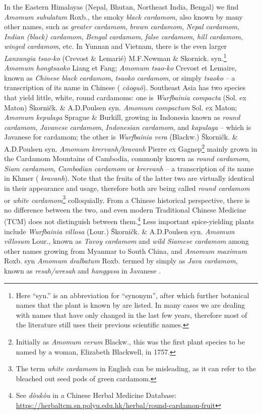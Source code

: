 \documentclass[12pt]{article}
\newcommand{\km}[1]{\khmerfont{#1}\rmfamily}
\newcommand{\jv}[1]{\javanesefont{#1}\rmfamily}
\newcommand{\tc}[1]{\traditionalchinesefont{#1}\rmfamily}
\begin{document}
In the Eastern Himalayas (Nepal, Bhutan, Northeast India, Bengal) we find \textit{Amomum subulatum} Roxb., the smoky \textit{black cardamom}, also known by many other names, such as \textit{greater cardamom}, \textit{brown cardamom}, \textit{Nepal cardamom}, \textit{Indian (black) cardamom}, \textit{Bengal cardamom}, \textit{false cardamom}, \textit{hill cardamom}, \textit{winged cardamom}, etc. In Yunnan and Vietnam, there is the even larger \textit{Lanxangia tsao-ko} (Crevost \& Lemarié) M.F.Newman \& Skornick. syn.\footnote{Here ``syn.'' is an abbreviation for ``synonym'', after which further botanical names that the plant is known by are listed. In many cases we are dealing with names that have only changed in the last few years, therefore most of the literature still uses their previous scientific names.} \textit{Amomum hongtsaoko} Liang et Fang; \textit{Amomum tsao-ko} Crevost et Lemaire, known as \textit{Chinese black cardamom}, \textit{tsaoko cardamom}, or simply \textit{tsaoko} -- a transcription of its name in Chinese (\tc{草果} \textit{cǎoguǒ}). Southeast Asia has two species that yield little, white, round cardamoms: one is \textit{Wurfbainia compacta} (Sol. ex Maton) Škorničk. \& A.D.Poulsen syn. \textit{Amomum compactum} Sol. ex Maton; \textit{Amomum kepulaga} Sprague \& Burkill, growing in Indonesia known as \textit{round cardamom}, \textit{Javanese cardamom}, \textit{Indonesian cardamom}, and \textit{kapulaga} -- which is Javanese for cardamom;
the other is \textit{Wurfbainia vera} (Blackw.) Škorničk. \& A.D.Poulsen syn. \textit{Amomum krervanh/kravanh} Pierre ex Gagnep\footnote{Initially as \textit{Amomum verum} Blackw., this was the first plant species to be named by a woman, Elizabeth Blackwell, in 1757.} mainly grown in the Cardamom Mountains of Cambodia, commonly known as \textit{round cardamom}, \textit{Siam cardamom}, \textit{Cambodian cardamom} or \textit{krervanh} -- a transcription of its name in Khmer (\km{ក្រវាញ} \textit{kravanh}). Note that the fruits of the latter two are virtually identical in their appearance and usage, therefore both are being called \textit{round cardamom} or \textit{white cardamom}\footnote{The term \textit{white cardamom} in English can be misleading, as it can refer to the bleached out seed pods of green cardamom.} colloquially. From a Chinese historical perspective, there is no difference between the two, and even modern Traditional Chinese Medicine (TCM) does not distinguish between them.\footnote{See \textit{dòukòu} in a Chinese Herbal Medicine Database: \url{https://herbaltcm.sn.polyu.edu.hk/herbal/round-cardamon-fruit}} Less important spice-yielding plants include \textit{Wurfbainia villosa} (Lour.) Škorničk. \& A.D.Poulsen syn. \textit{Amomum villosum} Lour., known as \textit{Tavoy cardamom} and \textit{wild Siamese cardamom} among other names growing from Myanmar to South China, and \textit{Amomum maximum}	Roxb. syn \textit{Amomum dealbatum} Roxb. termed by \textcite{vanwyk_2014_culinary} simply as \textit{Java cardamom}, known as \textit{resah/wresah} and \textit{hanggasa} in Javanese \parencite{burkill_1966_dictionary}. 
\end{document}
